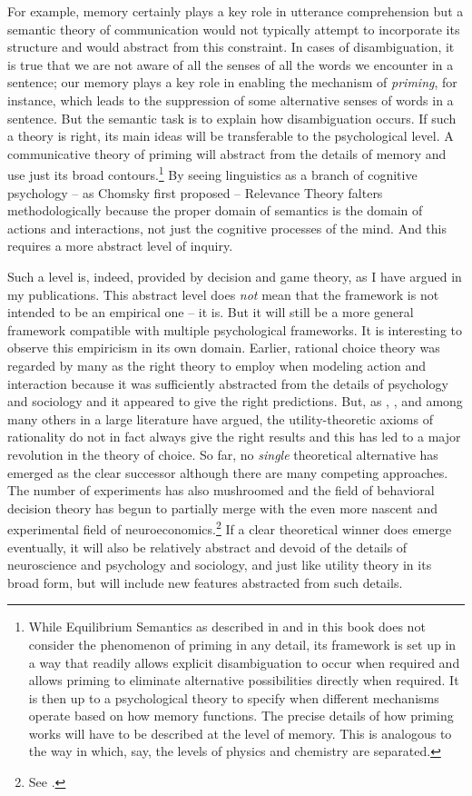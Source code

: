 For example, memory certainly plays a key role in utterance comprehension but a semantic theory of communication would not typically attempt to incorporate its structure and would abstract from this constraint. In cases of disambiguation, it is true that we are not aware of all the senses of all the words we encounter in a sentence; our memory plays a key role in enabling the mechanism of \emph{priming}, for instance, which leads to the suppression of some alternative senses of words in a sentence. But the semantic task is to explain how disambiguation occurs. If such a theory is right, its main ideas will be transferable to the psychological level. A communicative theory of priming will abstract from the details of memory and use just its broad contours.\footnote{While Equilibrium Semantics as described in \citet{parikh:le} and in this book does not consider the phenomenon of priming in any detail, its framework is set up in a way that readily allows explicit disambiguation to occur when required and allows priming to eliminate alternative possibilities directly when required. It is then up to a psychological theory to specify when different mechanisms operate based on how memory functions. The precise details of how priming works will have to be described at the level of memory. This is analogous to the way in which, say, the levels of physics and chemistry are separated.} By seeing linguistics as a branch of cognitive psychology -- as Chomsky first proposed -- Relevance Theory falters methodologically because the proper domain of semantics is the domain of actions and interactions, not just the cognitive processes of the mind. And this requires a more abstract level of inquiry.

Such a level is, indeed, provided by decision and game theory, as I have argued in my publications. This abstract level does \emph{not} mean that the framework is not intended to be an empirical one -- it is. But it will still be a more general framework compatible with multiple psychological frameworks. It is interesting to observe this empiricism in its own domain. Earlier, rational choice theory was regarded by many as the right theory to employ when modeling action and interaction because it was sufficiently abstracted from the details of psychology and sociology and it appeared to give the right predictions. But, as \citet{allais:risk}, \citet{simon:bmrc, simon:rcse}, and \citet{kt:pt, kst:juu} among many others in a large literature have argued, the utility-theoretic axioms of rationality do not in fact always give the right results and this has led to a major revolution in the theory of choice. So far, no \emph{single} theoretical alternative has emerged as the clear successor although there are many competing approaches. The number of experiments has also mushroomed and the field of behavioral decision theory has begun to partially merge with the even more nascent and experimental field of neuroeconomics.\footnote{See \citet{glimcher:dub}.} If a clear theoretical winner does emerge eventually, it will also be relatively abstract and devoid of the details of neuroscience and psychology and sociology, and just like utility theory in its broad form, but will include new features abstracted from such details.

